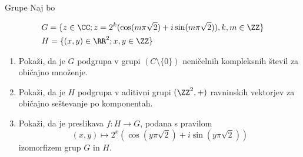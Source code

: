 \begin{frame}{Grupe}
	Naj bo
	
	\begin{align*}
	&G = \{ z\in\CC; z=2^k(\cos({m\pi\sqrt{2}})+i\sin({m\pi\sqrt{2}})), k, m\in\ZZ \}\\
	&H = \{(x,y)\in\RR^2;x,y\in\ZZ\}
	\end{align*}
	\begin{enumerate}
		\item
			Pokaži, da je $G$ podgrupa v grupi $(C\setminus\{0\}) $
			neničelnih kompleksnih števil za običajno množenje.
		\item
			Pokaži, da je $H$ podgrupa v aditivni grupi $(\ZZ^2,+)$
			ravninskih vektorjev za običajno seštevanje po komponentah.
		\item
			Pokaži, da je preslikava $f:H\to G$, podana s pravilom
			$$
			(x,y)\mapsto 2^x(\cos(y\pi\sqrt{2})+i\sin(y\pi\sqrt{2}))
			$$
			izomorfizem grup $G$ in $H$.
	\end{enumerate}
\end{frame}
